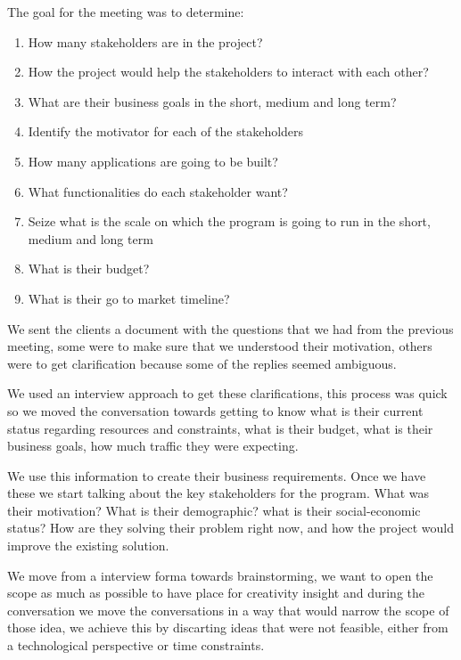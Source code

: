 The goal for the meeting was to determine:
\begin{enumerate}
    \item How many stakeholders are in the project?
    \item How the project would help the stakeholders to interact with each other?
    \item What are their business goals in the short, medium and long term?
    \item Identify the motivator for each of the stakeholders
    \item How many applications are going to be built?
    \item What functionalities do each stakeholder want? 
    \item Seize what is the scale on which the program is going to run in the short, medium and long term
    \item What is their budget?
    \item What is their go to market timeline?
\end{enumerate}

\noindent We sent the clients a document with the questions that we had from 
the previous meeting, some were to make sure that we understood their 
motivation, others were to get clarification because some of the replies 
seemed ambiguous.\newline

\noindent We used an interview approach to get these clarifications, this 
process was quick so we moved the conversation towards getting to know what is 
their current status regarding resources and constraints, what is their budget, 
what is their business goals, how much traffic they were expecting.\newline

\noindent We use this information to create their business requirements. Once 
we have these we start talking about the key stakeholders for the program. What 
was their motivation? What is their demographic? what is their social-economic 
status? How are they solving their problem right now, and how the project 
would improve the existing solution.\newline

\noindent We move from a interview forma towards brainstorming, we want to open 
the scope as much as possible to have place for creativity insight and during 
the conversation we move the conversations in a way that would narrow the scope 
of those idea, we achieve this by discarting ideas that were not feasible, 
either from a technological perspective or time constraints.

